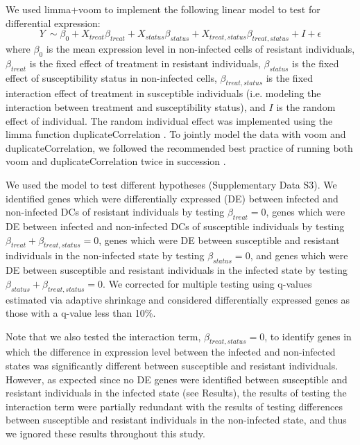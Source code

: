 \documentclass[fleqn,10pt]{wlscirep}
\begin{document}
We used limma+voom \cite{Smyth2004, Law2014, Ritchie2015} to implement
the following linear model to test for differential expression:
\begin{equation} \label{eq:limma}
Y\ \sim \beta_{0} + X_{treat}\beta_{treat} + X_{status}\beta_{status} + X_{treat,status}\beta_{treat,status} + I + \epsilon
\end{equation}
where $\beta_{0}$ is the mean expression level in non-infected cells
of resistant individuals, $\beta_{treat}$ is the fixed effect of
treatment in resistant individuals, $\beta_{status}$ is the fixed
effect of susceptibility status in non-infected cells,
$\beta_{treat,status}$ is the fixed interaction effect of treatment in
susceptible individuals (i.e. modeling the interaction between
treatment and susceptibility status), and $I$ is the random effect of
individual. The random individual effect was implemented using the
limma function duplicateCorrelation \cite{Smyth2005}. To jointly model
the data with voom and duplicateCorrelation, we followed the
recommended best practice of running both voom and
duplicateCorrelation twice in succession \cite{Liu2015}.

We used the model to test different hypotheses (Supplementary Data
S3). We identified genes which were differentially expressed (DE)
between infected and non-infected DCs of resistant individuals by
testing $\beta_{treat} = 0$, genes which were DE between infected and
non-infected DCs of susceptible individuals by testing $\beta_{treat}
+ \beta_{treat,status} = 0$, genes which were DE between susceptible
and resistant individuals in the non-infected state by testing
$\beta_{status} = 0$, and genes which were DE between susceptible and
resistant individuals in the infected state by testing $\beta_{status}
+ \beta_{treat,status} = 0$. We corrected for multiple testing using
q-values estimated via adaptive shrinkage \cite{Stephens2016} and
considered differentially expressed genes as those with a q-value less
than 10\%.

Note that we also tested the interaction term, $\beta_{treat,status} =
0$, to identify genes in which the difference in expression level
between the infected and non-infected states was significantly
different between susceptible and resistant individuals. However, as
expected since no DE genes were identified between susceptible and
resistant individuals in the infected state (see Results), the results
of testing the interaction term were partially redundant with the
results of testing differences between susceptible and resistant
individuals in the non-infected state, and thus we ignored these
results throughout this study.
\end{document}
